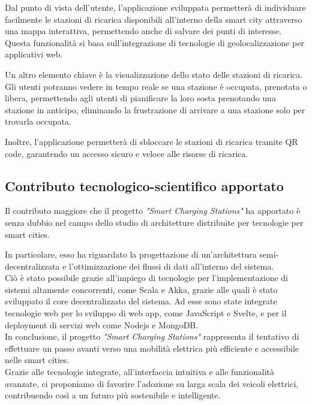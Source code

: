 Dal punto di vista dell'utente, l'applicazione sviluppata permetterà di individuare facilmente le
stazioni di ricarica disponibili all'interno della smart city attraverso una mappa interattiva, permettendo anche di
salvare dei punti di interesse.
Questa funzionalità si basa sull'integrazione di tecnologie di geolocalizzazione per applicativi web.

Un altro elemento chiave è la visualizzazione dello stato delle stazioni di ricarica.
Gli utenti potranno vedere in tempo reale se una stazione è occupata, prenotata o libera, permettendo
agli utenti di pianificare la loro sosta prenotando una stazione in anticipo, eliminando la frustrazione di arrivare a una stazione
solo per trovarla occupata.

Inoltre, l'applicazione permetterà di sbloccare le stazioni di ricarica tramite QR code, garantendo un accesso sicuro e veloce alle risorse di ricarica.

\subsection{Contributo tecnologico-scientifico apportato}
Il contributo maggiore che il progetto \textit{"Smart Charging Stations"} ha apportato
è senza dubbio nel campo dello studio di architetture distribuite per tecnologie per smart
cities.

In particolare, esso ha riguardato la progettazione di un'architettura semi-decentralizzata
e l'ottimizzazione dei flussi di dati all'interno del sistema.\\

Ciò è stato possibile grazie all'impiego di tecnologie per l'implementazione di sistemi
altamente concorrenti, come Scala \cite{scala} e Akka\cite{akka}, grazie alle quali è
stato sviluppato il core decentralizzato del sistema.
Ad esse sono state integrate tecnologie web per lo sviluppo di web app, come JavaScript\cite{javascript}
e Svelte\cite{svelte}, e per il deployment di servizi web come Nodejs\cite{node} e MongoDB\cite{mongo}.\\

In conclusione, il progetto \textit{"Smart Charging Stations"} rappresenta il tentativo di
effettuare un passo avanti verso una mobilità elettrica più efficiente e accessibile
nelle smart cities.\\

Grazie alle tecnologie integrate, all'interfaccia intuitiva e alle funzionalità
avanzate, ci proponiamo di favorire l'adozione su larga scala dei veicoli elettrici,
contribuendo così a un futuro più sostenibile e intelligente.



